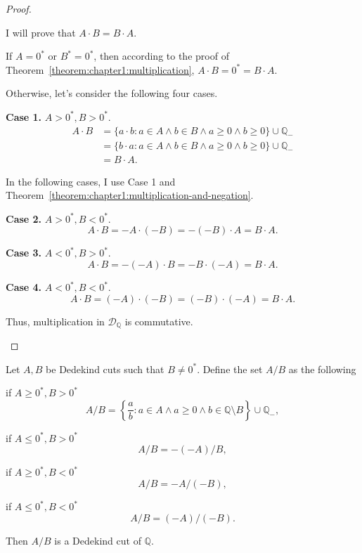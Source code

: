 \begin{proof}
\begin{enumerate}[label={(F\arabic*)}, start=5]
              I will prove that $A\cdot B = B\cdot A$.

              If $A = {0}^{*}$ or $B^{*} = {0}^{*}$, then according to the proof of Theorem~\ref{theorem:chapter1:multiplication}, $A\cdot B = {0}^{*} = B\cdot A$.

              Otherwise, let's consider the following four cases.

              \textbf{Case 1.} $A > {0}^{*}, B > {0}^{*}$.
              \begin{align*}
                  A\cdot B & = \{ a\cdot b : a\in A\land b\in B\land a\ge 0\land b\ge 0 \}\cup\mathbb{Q}_{-} \\
                           & = \{ b\cdot a : a\in A\land b\in B\land a\ge 0\land b\ge 0 \}\cup\mathbb{Q}_{-} \\
                           & = B\cdot A.
              \end{align*}

              In the following cases, I use Case 1 and Theorem~\ref{theorem:chapter1:multiplication-and-negation}.

              \textbf{Case 2.} $A > {0}^{*}, B < {0}^{*}$.
              \[
                  A\cdot B = -A\cdot (-B) = -(-B)\cdot A = B\cdot A.
              \]

              \textbf{Case 3.} $A < {0}^{*}, B > {0}^{*}$.
              \[
                  A\cdot B = -(-A)\cdot B = -B\cdot (-A) = B\cdot A.
              \]

              \textbf{Case 4.} $A < {0}^{*}, B < {0}^{*}$.
              \[
                  A\cdot B = (-A)\cdot (-B) = (-B)\cdot (-A) = B\cdot A.
              \]

              Thus, multiplication in $\mathscr{D}_{\mathbb{Q}}$ is commutative.
    \end{enumerate}
\end{proof}

\begin{theorem}\label{theorem:chapter1:division}
    Let $A, B$ be Dedekind cuts such that $B\ne {0}^{*}$. Define the set $A/B$ as the following

    if $A\ge {0}^{*}, B > {0}^{*}$
    \[
        A/B = \left\{ \frac{a}{b} : a\in A\land a\ge 0\land b\in\mathbb{Q}\setminus B \right\}\cup\mathbb{Q}_{-},
    \]

    if $A\le {0}^{*}, B > {0}^{*}$
    \[
        A/B = -(-A)/B,
    \]

    if $A\ge {0}^{*}, B < {0}^{*}$
    \[
        A/B = -A/(-B),
    \]

    if $A\le {0}^{*}, B < {0}^{*}$
    \[
        A/B = (-A)/(-B).
    \]

    Then $A/B$ is a Dedekind cut of $\mathbb{Q}$.
\end{theorem}

